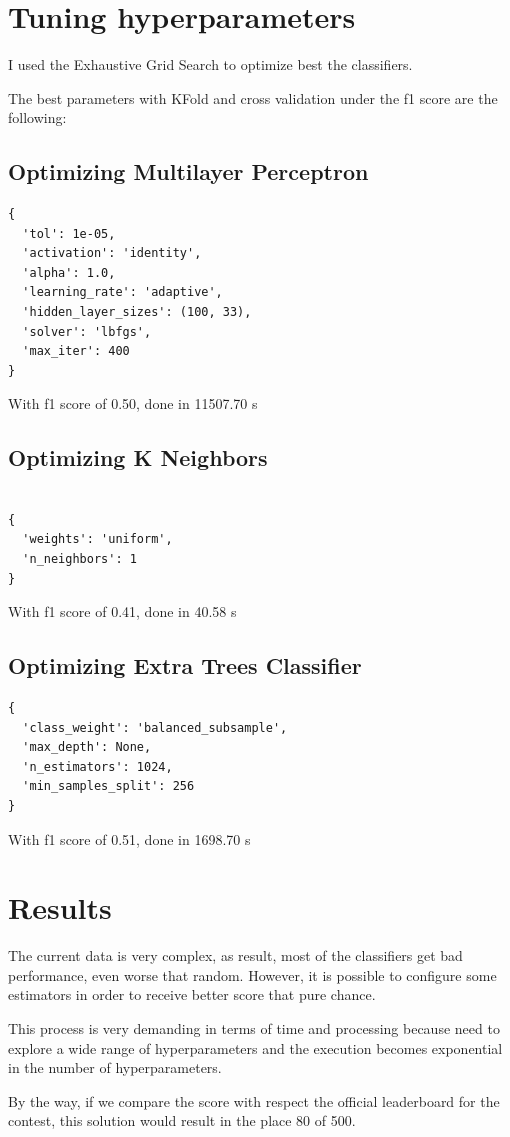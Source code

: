 \documentclass[a4paper]{article}
\begin{document}
\section{Tuning hyperparameters}

I used the Exhaustive Grid Search to optimize best the classifiers.


\noindent The best parameters with KFold and cross validation
under the f1 score are the following:

\subsection{Optimizing Multilayer Perceptron}

\begin{verbatim}
{
  'tol': 1e-05,
  'activation': 'identity',
  'alpha': 1.0,
  'learning_rate': 'adaptive',
  'hidden_layer_sizes': (100, 33),
  'solver': 'lbfgs',
  'max_iter': 400
}
\end{verbatim}
With f1 score of 0.50, done in 11507.70 s

\subsection{Optimizing K Neighbors}
\begin{verbatim}

{
  'weights': 'uniform',
  'n_neighbors': 1
}
\end{verbatim}
With f1 score of 0.41, done in 40.58 s
\subsection{Optimizing Extra Trees Classifier}
\begin{verbatim}
{
  'class_weight': 'balanced_subsample',
  'max_depth': None,
  'n_estimators': 1024,
  'min_samples_split': 256
}
\end{verbatim}

With f1 score of 0.51, done in 1698.70 s

\section{Results}

The current data is very complex, as result, most of the
classifiers get bad performance, even worse that random. However,
it is possible to configure some estimators in order to receive
better score that pure chance.

This process is very demanding in terms of time and processing because
need to explore a wide range of hyperparameters and the execution
becomes exponential in the number of hyperparameters.

By the way, if we compare the score with respect the official
leaderboard for the contest, this solution would result in the
place 80 of 500.

{}

\end{document}
